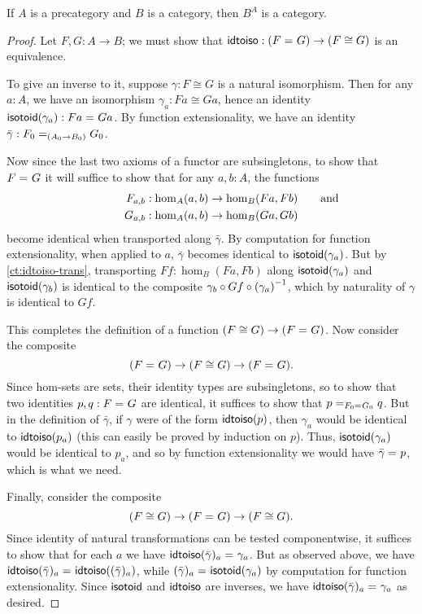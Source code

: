 \begin{thm}\label{ct:functor-cat}
  If $A$ is a precategory and $B$ is a category, then $B^A$ is a category.
\end{thm}
\begin{proof}
  Let $F,G:A\to B$; we must show that $\idtoiso:(\id{F}{G}) \to (F\cong G)$ is an equivalence.

  To give an inverse to it, suppose $\gamma:F\cong G$ is a natural isomorphism.
  Then for any $a:A$, we have an isomorphism $\gamma_a:Fa \cong Ga$, hence an identity $\isotoid(\gamma_a):\id{Fa}{Ga}$.
  By function extensionality, we have an identity $\bar{\gamma}:\id[(A_0\to B_0)]{F_0}{G_0}$.

  Now since the last two axioms of a functor are subsingletons, to show that $\id{F}{G}$ it will suffice to show that for any $a,b:A$, the functions
  \begin{align*}
    F_{a,b}&:\hom_A(a,b) \to \hom_B(Fa,Fb)\mathrlap{\qquad\text{and}}\\
    G_{a,b}&:\hom_A(a,b) \to \hom_B(Ga,Gb)
  \end{align*}
  become identical when transported along $\bar\gamma$.
  By computation for function extensionality, when applied to $a$, $\bar\gamma$ becomes identical to $\isotoid(\gamma_a)$.
  But by \autoref{ct:idtoiso-trans}, transporting $Ff:\hom_B(Fa,Fb)$ along $\isotoid(\gamma_a)$ and $\isotoid(\gamma_b)$ is identical to the composite $\gamma_b\circ Gf\circ \inv{(\gamma_a)}$, which by naturality of $\gamma$ is identical to $Gf$.

  This completes the definition of a function $(F\cong G) \to (\id F G)$.
  Now consider the composite
  \[ (\id F G) \to (F\cong G) \to (\id F G). \]
  Since hom-sets are sets, their identity types are subsingletons, so to show that two identities $p,q:\id F G$ are identical, it suffices to show that $\id[\id{F_0}{G_0}]{p}{q}$.
  But in the definition of $\bar\gamma$, if $\gamma$ were of the form $\idtoiso(p)$, then $\gamma_a$ would be identical to $\idtoiso(p_a)$ (this can easily be proved by induction on $p$).
  Thus, $\isotoid(\gamma_a)$ would be identical to $p_a$, and so by function extensionality we would have $\id{\bar\gamma}{p}$, which is what we need.

  Finally, consider the composite
  \[(F\cong G)\to  (\id F G) \to (F\cong G). \]
  Since identity of natural transformations can be tested componentwise, it suffices to show that for each $a$ we have $\id{\idtoiso(\bar\gamma)_a}{\gamma_a}$.
  But as observed above, we have $\id{\idtoiso(\bar\gamma)_a}{\idtoiso((\bar\gamma)_a)}$, while $\id{(\bar\gamma)_a}{\isotoid(\gamma_a)}$ by computation for function extensionality.
  Since $\isotoid$ and $\idtoiso$ are inverses, we have $\id{\idtoiso(\bar\gamma)_a}{\gamma_a}$ as desired.
\end{proof}

